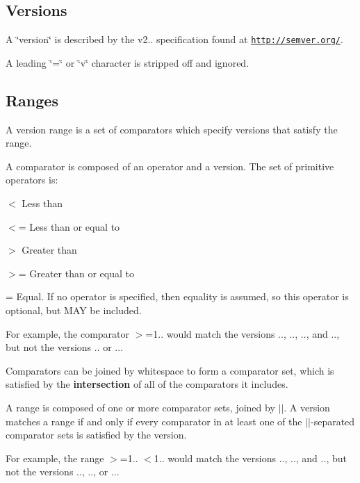 \subsection*{Versions}

A \char`\"{}version\char`\"{} is described by the {\ttfamily v2..} specification found at \href{http://semver.org/}{\tt http\+://semver.\+org/}.

A leading {\ttfamily \char`\"{}=\char`\"{}} or {\ttfamily \char`\"{}v\char`\"{}} character is stripped off and ignored.

\subsection*{Ranges}

A {\ttfamily version range} is a set of {\ttfamily comparators} which specify versions that satisfy the range.

A {\ttfamily comparator} is composed of an {\ttfamily operator} and a {\ttfamily version}. The set of primitive {\ttfamily operators} is\+:


\begin{DoxyItemize}
\item {\ttfamily $<$} Less than
\item {\ttfamily $<$=} Less than or equal to
\item {\ttfamily $>$} Greater than
\item {\ttfamily $>$=} Greater than or equal to
\item {\ttfamily =} Equal. If no operator is specified, then equality is assumed, so this operator is optional, but M\+AY be included.
\end{DoxyItemize}

For example, the comparator {\ttfamily $>$=1..} would match the versions {..}, {..}, {..}, and {..}, but not the versions {..} or {..}.

Comparators can be joined by whitespace to form a {\ttfamily comparator set}, which is satisfied by the {\bfseries intersection} of all of the comparators it includes.

A range is composed of one or more comparator sets, joined by {\ttfamily $\vert$$\vert$}. A version matches a range if and only if every comparator in at least one of the {\ttfamily $\vert$$\vert$}-\/separated comparator sets is satisfied by the version.

For example, the range {\ttfamily $>$=1.. $<$1..} would match the versions {..}, {..}, and {..}, but not the versions {..}, {..}, or {..}.

